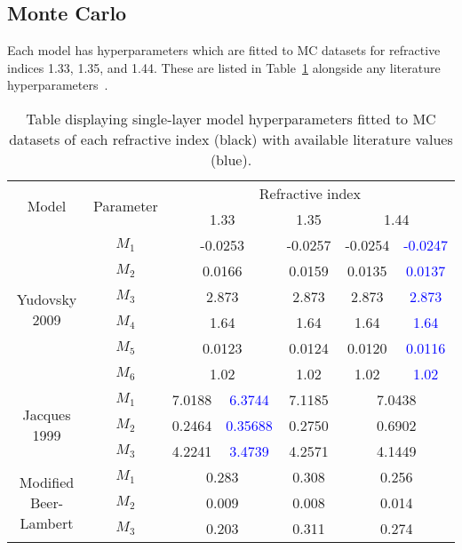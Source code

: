 \subsection{Monte Carlo}\label{sec:resultsMC}
Each model has hyperparameters which are fitted to MC datasets for refractive indices 1.33, 1.35, and 1.44. These are listed in 
Table~\ref{tb:fittedmodelparams}
alongside any literature hyperparameters~\citep{Jacques1999, Yudovsky2009}.
\begin{table}[htb!]
    \centering
    \caption{Table displaying single-layer model hyperparameters fitted to MC datasets of each refractive index (black) with available literature values (blue).}
    \begin{tabular}{|cc|cc|c|cc|}
        \hline
        \multirow{2}{*}{Model} & \multirow{2}{*}{Parameter} & \multicolumn{5}{c|}{Refractive index} \\
         & & \multicolumn{2}{c|}{1.33} & 1.35 & \multicolumn{2}{c|}{1.44} \\
        \hline
        \multirow{6}{*}{Yudovsky 2009} & $M_1$ & \multicolumn{2}{c|}{-0.0253} & -0.0257 & -0.0254 & \textcolor{blue}{-0.0247} \\
        & $M_2$ & \multicolumn{2}{c|}{0.0166} & 0.0159 & 0.0135 & \textcolor{blue}{0.0137} \\
        & $M_3$ & \multicolumn{2}{c|}{2.873} & 2.873 & 2.873 & \textcolor{blue}{2.873} \\
        & $M_4$ & \multicolumn{2}{c|}{1.64} & 1.64 & 1.64 & \textcolor{blue}{1.64} \\
        & $M_5$ & \multicolumn{2}{c|}{0.0123} & 0.0124 & 0.0120 & \textcolor{blue}{0.0116} \\
        & $M_6$ & \multicolumn{2}{c|}{1.02} & 1.02 & 1.02 & \textcolor{blue}{1.02} \\
        \hline 
        \multirow{3}{*}{Jacques 1999} & $M_1$ & 7.0188 & \textcolor{blue}{6.3744} & 7.1185 & \multicolumn{2}{c|}{7.0438} \\
        & $M_2$ & 0.2464 & \textcolor{blue}{0.35688} & 0.2750 & \multicolumn{2}{c|}{0.6902} \\
        & $M_3$ & 4.2241 & \textcolor{blue}{3.4739} & 4.2571 & \multicolumn{2}{c|}{4.1449} \\
        \hline
        \multirow{3}{*}{Modified Beer-Lambert} & $M_1$ & \multicolumn{2}{c|}{0.283} & 0.308 & \multicolumn{2}{c|}{0.256} \\
        & $M_2$ & \multicolumn{2}{c|}{0.009} & 0.008 & \multicolumn{2}{c|}{0.014} \\
        & $M_3$ & \multicolumn{2}{c|}{0.203} & 0.311 & \multicolumn{2}{c|}{0.274} \\
        \hline
    \end{tabular}
    \label{tb:fittedmodelparams}%
\end{table}
